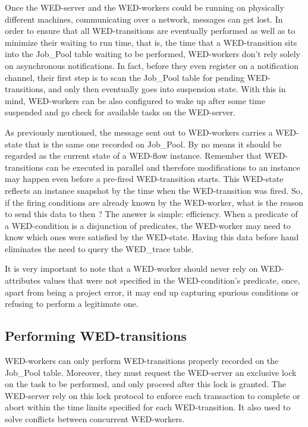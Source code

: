 \documentclass[12pt]{article}
\begin{document}
Once the WED-server and the WED-workers could be running on physically different machines, communicating over a network,  messages can get lost. In order to ensure that all WED-transitions are eventually performed as well as to minimize their waiting to run time,
that is, the time that a WED-transition sits into the Job\_Pool table waiting to be performed, WED-workers don't rely solely on asynchronous notifications. In fact, before they even register on a notification channel, their first step is to scan the Job\_Pool table for pending WED-transitions, and only then eventually goes into suspension state. With this in mind,
WED-workers can be also configured to wake up after some time suspended and go check for available tasks on the WED-server.

As previously mentioned, the message sent out to WED-workers carries a WED-state that is the same one recorded on Job\_Pool. By no means it should be regarded as the current state of a WED-flow instance. Remember that WED-transitions can be executed
in parallel and therefore modifications to an instance may happen even before a pre-fired WED-transition starts. This WED-state reflects an instance snapshot by the time when the WED-transition was fired. So, if the firing conditions are already known by  the WED-worker, what is the reason to send this data to then ? The answer is simple: efficiency. When a predicate of a  WED-condition is a disjunction of predicates, the WED-worker may need to know which ones were satisfied by the WED-state. Having this data before hand eliminates the need to query the WED\_trace table.

It is very important to note that a WED-worker should never rely on WED-attributes values that were not specified in the WED-condition's predicate, once, apart from being a project error, it may end up capturing spurious conditions or refusing to perform a legitimate one.

\subsection{Performing WED-transitions}

WED-workers can only perform WED-transitions properly recorded on the Job\_Pool table. Moreover, they must request the WED-server an exclusive lock on the task to be performed, and only proceed after this lock is granted. The WED-server rely
on this lock protocol to enforce each transaction to complete or abort within the time limits specified for each WED-transition. It also used to solve conflicts between concurrent WED-workers. 
\end{document}
